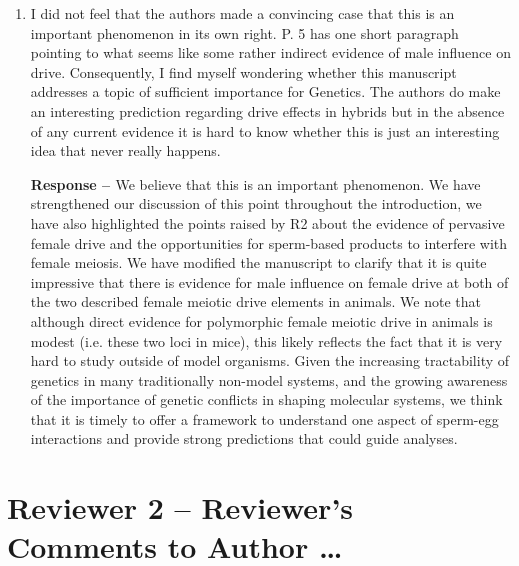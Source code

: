 \documentclass[12pt,letterpaper]{article}
\begin{document}
\begin{enumerate}
\item
\begin{singlespace}
I did not feel that the authors made a convincing case that this is an
important phenomenon in its own right.  P. 5 has one short paragraph pointing to
what seems like some rather indirect evidence of male influence on drive.
Consequently, I find myself wondering whether this manuscript addresses a topic
of sufficient importance for Genetics.  The authors do make an interesting
prediction regarding drive effects in hybrids but in the absence of any current
evidence it is hard to know whether this is just an interesting idea that never
really happens. \\
\end{singlespace}

\begin{singlespace}
	{\bf{Response -- }}  We believe that this is an important
        phenomenon. We have strengthened our discussion of this point
        throughout the introduction,
        we have also highlighted the points raised by R2 about 
        the evidence of pervasive female drive and the opportunities for
        sperm-based products
        to interfere with female meiosis.
	We have modified the manuscript to clarify that it is quite impressive that there is evidence
	for male influence on female drive at both of the two described
        female meiotic drive elements in animals. 
	We note that although direct evidence for polymorphic female meiotic drive
        in animals is modest (i.e. these two loci in mice), 
	this likely reflects the fact that it is very hard to study
        outside of model organisms. 
Given the increasing tractability of genetics in many traditionally
        non-model systems, and the growing awareness of the importance
        of genetic conflicts in shaping molecular systems, we think
        that it is timely to offer a framework to understand one
        aspect of sperm-egg 
        interactions and provide
strong predictions that could guide analyses.
\end{singlespace}
\end{enumerate}

\newpage

\section*{Reviewer 2 -- Reviewer's Comments to Author \dots}
\end{document}
